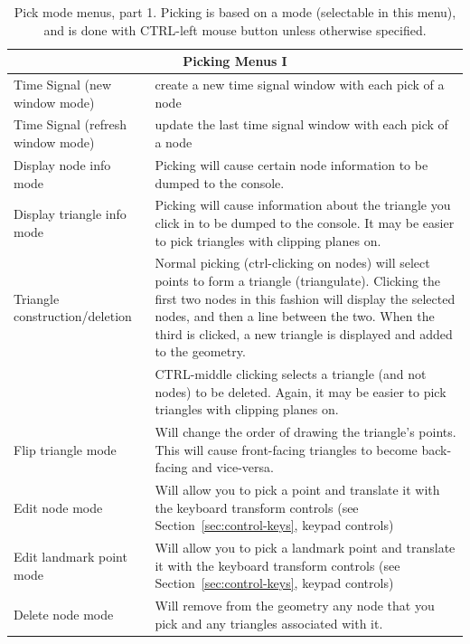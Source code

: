 \begin{table}[ht]
    \caption{\label{table:pickingone} Pick mode menus, part 1.  Picking is
      based on a 
      mode (selectable in this menu), and is done with CTRL-left mouse button
      unless otherwise specified.}
  \begin{center}
    \begin{tabular}{|l|p{4 in}|} \hline
      \multicolumn{2}{|c|}{\textbf{Picking Menus I}} \\ \hline
      Time Signal (new window mode) & create a new time signal window with
      each pick of a node \\
      Time Signal (refresh window mode) & update the last time signal 
      window with each pick of a node \\
      Display node info mode & Picking will cause certain node information
      to be dumped to the console. \\
      Display triangle info mode & Picking will cause information about
      the triangle you click in to be dumped to the console.
      It may be easier to pick triangles with clipping planes on. \\
      Triangle construction/deletion & Normal picking (ctrl-clicking on nodes)
      will select points to form a triangle (triangulate).  Clicking the first 
      two nodes in this fashion will display the selected nodes, and then a 
      line between the two.  When the third is clicked, a new triangle is 
      displayed and added to the geometry. \\
      & CTRL-middle clicking selects a triangle (and not nodes) to be deleted.
      Again, it may be easier to pick triangles with clipping planes on. \\
      Flip triangle mode & Will change the order of drawing the triangle's
      points.  This will cause front-facing triangles to become back-facing
      and vice-versa. \\
      Edit node mode & Will allow you to pick a point and translate it
      with the keyboard transform controls (see
      Section~\ref{sec:control-keys}, keypad controls) \\
      Edit landmark point mode & Will allow you to pick a landmark point
      and translate it with the keyboard transform controls (see
      Section~\ref{sec:control-keys}, keypad controls) \\
      Delete node mode & Will remove from the geometry any node that you pick
      and any triangles associated with it. \\
      \hline
  \end{tabular}
\end{center}
\end{table}

